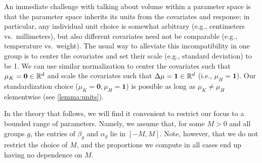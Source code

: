 An immediate challenge with talking about volume within a parameter space is that the parameter space inherits
its units from the covariates and response; in particular, any individual unit choice is somewhat
arbitrary (e.g., centimeters vs.\ millimeters), but also different covariates need not be 
comparable (e.g., temperature vs.\ weight). 
The usual way to alleviate this incompatibility in one group is to center the covariates and set their scale (e.g., standard deviation) to be 1. 
We can use similar normalization to center the covariates such that $\mu_K = \mathbf{0} \in \mathbb{R}^d$ and scale the covariates such that $\Delta\mu = \mathbf{1} \in \mathbb{R}^d$ (i.e., $\mu_H = \mathbf{1}$).
Our standardization choice ($\mu_K= \mathbf{0},\mu_H=\mathbf{1}$) is
possible as long as $\mu_K \neq \mu_H$ elementwise (see \cref{lemma:units}).

In the theory that follows, we will find it convenient to restrict our focus to a bounded range of parameters. Namely, we
assume that, for some $M > 0$ and all groups $g$, the entries of $\beta_g$ and $\alpha_g$ lie in $[-M,M]$.
Note, however, that we do not restrict the choice of $M$, and the proportions we compute in all
cases end up having no dependence on $M$.

